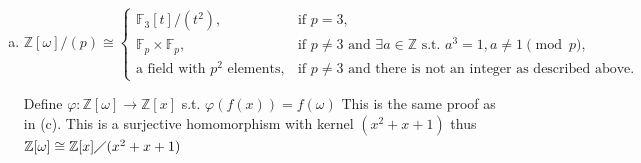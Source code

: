 \documentclass[12pt, letterpaper]{article}
\newcommand{\Z}{\mathbb{Z}}
\newcommand{\N}{\mathbb{N}}
\newcommand{\F}{\mathbb{F}}
\begin{document}
\begin{enumerate}[(a)]
    This is clearly surjective since $f(k)=k$ for $k \in \F_p$

    The kernel is also all polynomial's with a root of $a$ thus this is the set divisible by $x-a$ which his $(x-a)$

    Thus by the first isomorphism theorem $\F_p[x] \diagup (x-a) \cong \F_p$ do the same for $\F_p[x] \diagup (x+a) \cong \F_p$

    \[\F_p[x] \diagup (x-a) \times \F_p[x] \diagup (x+a) \cong \F_p \times \F_p\]

    Let $p$ be odd s.t. there is no integer s.t. $x^2 = -1 \pmod {p}$

    Ok do the same thing as above, and we get to $\Z[i] \diagup (p) \cong \F_p[x] \diagup (x^2+1)$. Since there is no integer s.t. $x^2 = -1$ this implies that $(x^2+1)$ is irreducible in $\F_p[x]$. Thus proven in class since this is not zero we know that $(x^2+1)$ is prime and maximal. Thus proven in class since $(x^2+1)$ is maximal this implies that $F_p[x] \diagup (x^2+1)$ is a field.

    Now for the size. Since we have the relation $x^2=-1$ this implies that we can write every polynomial in $\F_p[x]$ as:
    \[a+bx, \quad a,b \in \F_p\]

    The reason is if we have a term $cx^n$ s.t. $c \in \F_p$ and $n > 1$. We can use the division algorithm and get $n=2q+r$ s.t. $q \in \N$ and $r \in \{0,1\}$

    Thus $cx^n=c(-1)^qx^r$

    Thus, since $a,b$ are chosen independently in $\F_p$ we get $p$ choices for $a$ and $p$ for $b$ thus we get $p^2$ elements.

    \item \[
            \mathbb{Z}[\omega]/(p) \cong
            \begin{cases}
            \mathbb{F}_3[t]/(t^2), & \text{if } p = 3,\\
            \mathbb{F}_p \times \mathbb{F}_p, & \text{if $p\neq3$ and } \exists a \in \Z \text{ s.t. } a^3=1,a\neq1 \pmod{p},\\
            \text{a field with } p^2 \text{ elements}, & \text{if $p\neq3$ and there is not an integer as described above}.
            \end{cases}
            \]
    
    Define $\varphi: \Z[\omega] \to \Z[x]$ s.t. $\varphi(f(x))=f(\omega)$ This is the same proof as in (c). This is a surjective homomorphism with kernel $(x^2+x+1)$ thus $\Z[\omega] \cong \Z[x] \diagup (x^2+x+1)$


\end{enumerate}
\end{document}
